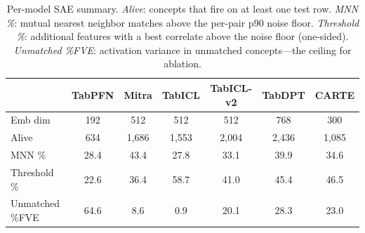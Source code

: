 \begin{table}[h]
\centering
\small
\caption{Per-model SAE summary. \emph{Alive}: concepts that fire on at least one test row. \emph{MNN \%}: mutual nearest neighbor matches above the per-pair p90 noise floor. \emph{Threshold \%}: additional features with a best correlate above the noise floor (one-sided). \emph{Unmatched \%FVE}: activation variance in unmatched concepts---the ceiling for ablation.}
\label{tab:matching_summary}
\setlength{\tabcolsep}{5pt}
\begin{tabular}{lcccccc}
\toprule
 & TabPFN & Mitra & TabICL & TabICL-v2 & TabDPT & CARTE \\
\midrule
Emb dim & 192 & 512 & 512 & 512 & 768 & 300 \\
Alive & 634 & 1,686 & 1,553 & 2,004 & 2,436 & 1,085 \\
MNN \% & 28.4 & 43.4 & 27.8 & 33.1 & 39.9 & 34.6 \\
Threshold \% & 22.6 & 36.4 & 58.7 & 41.0 & 45.4 & 46.5 \\
Unmatched \%FVE & 64.6 & 8.6 & 0.9 & 20.1 & 28.3 & 23.0 \\
\bottomrule
\end{tabular}
\end{table}
